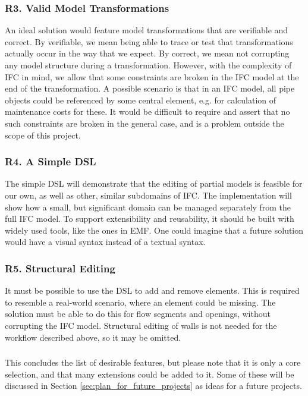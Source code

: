 \subsubsection{R3. Valid Model Transformations}
An ideal solution would feature model transformations that are verifiable and correct. By verifiable, we mean being able to trace or test that transformations actually occur in the way that we expect. By correct, we mean not corrupting any model structure during a transformation. However, with the complexity of IFC in mind, we allow that some constraints are broken in the IFC model at the end of the transformation. A possible scenario is that in an IFC model, all pipe objects could be referenced by some central element, e.g. for calculation of maintenance costs for these. It would be difficult to require and assert that no such constraints are broken in the general case, and is a problem outside the scope of this project.

\subsubsection{R4. A Simple DSL}
The simple DSL will demonstrate that the editing of partial models is feasible for our own, as well as other, similar subdomains of IFC. The implementation will show how a small, but significant domain can be managed separately from the full IFC model. To support extensibility and reusability, it should be built with widely used tools, like the ones in EMF.  One could imagine that a future solution would have a visual syntax instead of a textual syntax.

\subsubsection{R5. Structural Editing}
It must be possible to use the DSL to add and remove elements. This is required to resemble a real-world scenario, where an element could be missing. The solution must be able to do this for flow segments and openings, without corrupting the IFC model. Structural editing of walls is not needed for the workflow described above, so it may be omitted.

\subsubsection{}
This concludes the list of desirable features, but please note that it is only a core selection, and that many extensions could be added to it. Some of these will be discussed in Section \ref{sec:plan_for_future_projects} as ideas for a future projects.

